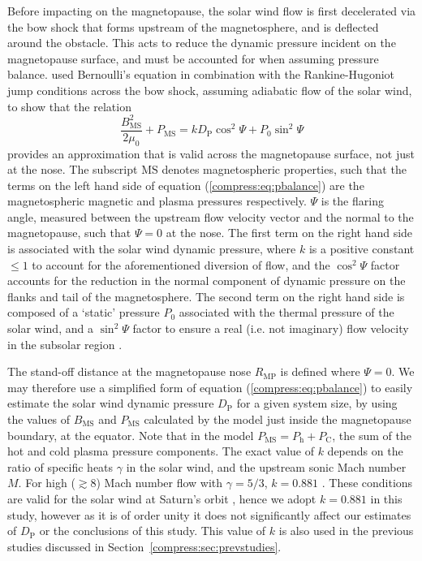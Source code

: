 Before impacting on the magnetopause, the solar wind flow is first decelerated via the bow shock that forms upstream of the magnetosphere, and is deflected around the obstacle. This acts to reduce the dynamic pressure incident on the magnetopause surface, and must be accounted for when assuming pressure balance. \citet{petrinec1997} used Bernoulli's equation in combination with the Rankine-Hugoniot jump conditions across the bow shock, assuming adiabatic flow of the solar wind, to show that the relation
\begin{equation}\label{compress:eq:pbalance}
\frac{B_{\mathrm{MS}}^2}{2\mu_0} + P_{\mathrm{MS}} = kD_\mathrm{P}\cos^2\Psi + P_0\sin^2\Psi
\end{equation}
provides an approximation that is valid across the magnetopause surface, not just at the nose. The subscript $\mathrm{MS}$ denotes magnetospheric properties, such that the terms on the left hand side of equation (\ref{compress:eq:pbalance}) are the magnetospheric magnetic and plasma pressures respectively. $\Psi$ is the flaring angle, measured between the upstream flow velocity vector and the normal to the magnetopause, such that $\Psi=0$ at the nose. The first term on the right hand side is associated with the solar wind dynamic pressure, where $k$ is a positive constant $\leq1$ to account for the aforementioned diversion of flow, and the $\cos^2\Psi$ factor accounts for the reduction in the normal component of dynamic pressure on the flanks and tail of the magnetosphere. The second term on the right hand side is composed of a `static' pressure $P_0$ associated with the thermal pressure of the solar wind, and a $\sin^2\Psi$ factor to ensure a real (i.e. not imaginary) flow velocity in the subsolar region \cite[see][]{petrinec1997}.

The stand-off distance at the magnetopause nose $R_\mathrm{MP}$ is defined where $\Psi = 0$. We may therefore use a simplified form of equation (\ref{compress:eq:pbalance}) to easily estimate the solar wind dynamic pressure $D_\mathrm{P}$ for a given system size, by using the values of $B_{\mathrm{MS}}$ and $P_{\mathrm{MS}}$ calculated by the model just inside the magnetopause boundary, at the equator. Note that in the model $P_{\mathrm{MS}}=P_\mathrm{h}+P_\mathrm{C}$, the sum of the hot and cold plasma pressure components. The exact value of $k$ depends on the ratio of specific heats $\gamma$ in the solar wind, and the upstream sonic Mach number $M$. For high ($\gtrsim 8$) Mach number flow with $\gamma = 5/3$, $k = 0.881$ \citep{spreiter1966}. These conditions are valid for the solar wind at Saturn's orbit \cite[e.g.][]{slavin1985,achilleos2006}, hence we adopt $k = 0.881$ in this study, however as it is of order unity it does not significantly affect our estimates of $D_\mathrm{P}$ or the conclusions of this study. This value of $k$ is also used in the previous studies discussed in Section~\ref{compress:sec:prevstudies}.

